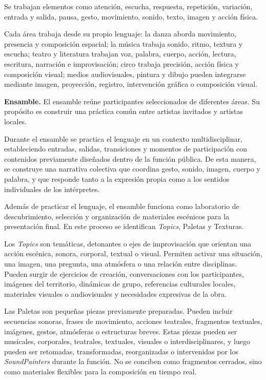 \documentclass[11pt,a4paper]{article}
\begin{document}
Se trabajan elementos como atención, escucha, respuesta, repetición, variación, entrada y salida, pausa, gesto, movimiento, sonido, texto, imagen y acción física.

Cada área trabaja desde su propio lenguaje: la danza aborda movimiento, presencia y composición espacial; la música trabaja sonido, ritmo, textura y escucha; teatro y literatura trabajan voz, palabra, cuerpo, acción, lectura, escritura, narración e improvisación; circo trabaja precisión, acción física y composición visual; medios audiovisuales, pintura y dibujo pueden integrarse mediante imagen, proyección, registro, intervención gráfica o composición visual.

\textbf{Ensamble.} El ensamble reúne participantes seleccionados de diferentes áreas. Su propósito es construir una práctica común entre artistas invitados y artistas locales.

Durante el ensamble se practica el lenguaje en un contexto multidisciplinar, estableciendo entradas, salidas, transiciones y momentos de participación con contenidos previamente diseñados dentro de la función pública. De esta manera, se construye una narrativa colectiva que coordina gesto, sonido, imagen, cuerpo y palabra, y que responde tanto a la expresión propia como a los sentidos individuales de los intérpretes.

Además de practicar el lenguaje, el ensamble funciona como laboratorio de descubrimiento, selección y organización de materiales escénicos para la presentación final. En este proceso se identifican \textit{Topics}, Paletas y Texturas.

Los \textit{Topics} son temáticas, detonantes o ejes de improvisación que orientan una acción escénica, sonora, corporal, textual o visual. Permiten activar una situación, una imagen, una pregunta, una atmósfera o una relación entre disciplinas. Pueden surgir de ejercicios de creación, conversaciones con los participantes, imágenes del territorio, dinámicas de grupo, referencias culturales locales, materiales visuales o audiovisuales y necesidades expresivas de la obra.

Las Paletas son pequeñas piezas previamente preparadas. Pueden incluir secuencias sonoras, frases de movimiento, acciones teatrales, fragmentos textuales, imágenes, gestos, atmósferas o estructuras breves. Estas piezas pueden ser musicales, corporales, teatrales, textuales, visuales o interdisciplinares, y luego pueden ser retomadas, transformadas, reorganizadas o intervenidas por los \textit{SoundPainters} durante la función. No se conciben como fragmentos cerrados, sino como materiales flexibles para la composición en tiempo real.
\end{document}
